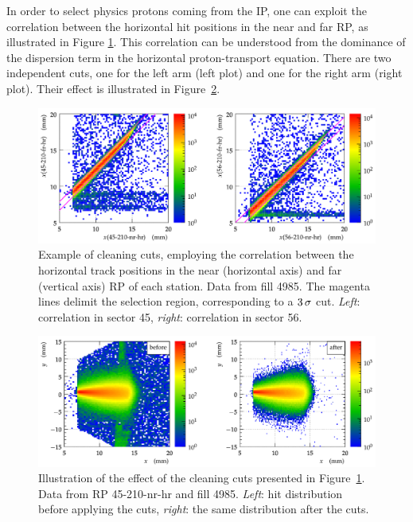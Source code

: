 \documentclass[TOTEM]{cern/cernphprep}
\def\un#1{\,{\rm #1}}
\begin{document}
In order to select physics protons coming from the IP, one can exploit the correlation between the horizontal hit positions in the near and far RP, as illustrated in Figure \ref{fig:hor_cuts}. This correlation can be understood from the dominance of the dispersion term in the horizontal proton-transport equation. There are two independent cuts, one for the left arm (left plot) and one for the right arm (right plot). Their effect is illustrated in Figure~\ref{fig:hor_cuts_effect}.

\begin{figure}[h!]
\begin{center}
\includegraphics[width=0.7\hsize]{fig/physics_fills/hor_cuts.pdf}
\caption{%
Example of cleaning cuts, employing the correlation between the horizontal track positions in the near (horizontal axis) and far (vertical axis) RP of each station. Data from fill 4985. The magenta lines delimit the selection region, corresponding to a $3\un{\sigma}$ cut. {\it Left}: correlation in sector 45, {\it right}: correlation in sector 56.
}
\label{fig:hor_cuts}
\end{center}
\end{figure}


\begin{figure}[h!]
\begin{center}
\includegraphics[width=0.7\hsize]{fig/physics_fills/hor_cuts_effect_cmp.pdf}
\caption{%
Illustration of the effect of the cleaning cuts presented in Figure~\ref{fig:hor_cuts}. Data from RP 45-210-nr-hr and fill 4985. {\it Left}: hit distribution before applying the cuts, {\it right}: the same distribution after the cuts.
}
\label{fig:hor_cuts_effect}
\end{center}
\end{figure}
\end{document}
